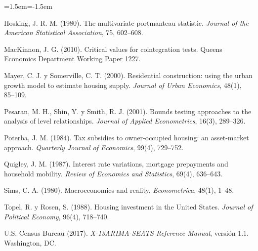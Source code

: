 \documentclass[11pt,a4paper]{article}
\begin{document}
\begin{list}{}{\leftmargin=1.5em\itemindent=-1.5em\itemsep=3pt}
\item Hosking, J. R. M. (1980). The multivariate portmanteau statistic. \emph{Journal of the American Statistical Association}, 75, 602--608.
\item MacKinnon, J. G. (2010). Critical values for cointegration tests. Queen\textquotesingle s Economics Department Working Paper 1227.
\item Mayer, C. J. y Somerville, C. T. (2000). Residential construction: using the urban growth model to estimate housing supply. \emph{Journal of Urban Economics}, 48(1), 85--109.
\item Pesaran, M. H., Shin, Y. y Smith, R. J. (2001). Bounds testing approaches to the analysis of level relationships. \emph{Journal of Applied Econometrics}, 16(3), 289--326.
\item Poterba, J. M. (1984). Tax subsidies to owner-occupied housing: an asset-market approach. \emph{Quarterly Journal of Economics}, 99(4), 729--752.
\item Quigley, J. M. (1987). Interest rate variations, mortgage prepayments and household mobility. \emph{Review of Economics and Statistics}, 69(4), 636--643.
\item Sims, C. A. (1980). Macroeconomics and reality. \emph{Econometrica}, 48(1), 1--48.
\item Topel, R. y Rosen, S. (1988). Housing investment in the United States. \emph{Journal of Political Economy}, 96(4), 718--740.
\item U.S. Census Bureau (2017). \emph{X-13ARIMA-SEATS Reference Manual}, versión 1.1. Washington, DC.
\end{list}
\end{document}
